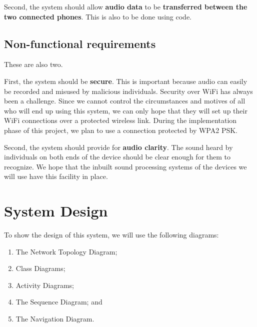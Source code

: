 \documentclass[12pt,svgnames,smaller]{article} %
\begin{document}
	Second, the system should allow \textbf{audio data} to be \textbf{transferred between the two connected phones}. This is also to be done using code.
	
	
	\subsection{Non-functional requirements}
	
	These are also two.
	
	First, the system should be \textbf{secure}. This is important because audio can easily be recorded and misused by malicious individuals. Security over WiFi has always been a challenge. Since we cannot control the circumstances and motives of all who will end up using this system, we can only hope that they will set up their WiFi connections over a protected wireless link. During the implementation phase of this project, we plan to use a connection protected by WPA2 PSK.
	
	Second, the system should provide for \textbf{audio clarity}. The sound heard by individuals on both ends of the device should be clear enough for them to recognize. We hope that the inbuilt sound processing systems of the devices we will use have this facility in place.
	
	
	
	
	\section{\textbf{System Design}}
	
	To show the design of this system, we will use the following diagrams:
	
	\begin{enumerate}
		\item The Network Topology Diagram;
		\item Class Diagrams; 
		\item Activity Diagrams; 
		\item The Sequence Diagram; and
		\item The Navigation Diagram.
	\end{enumerate}
	
\end{document}

